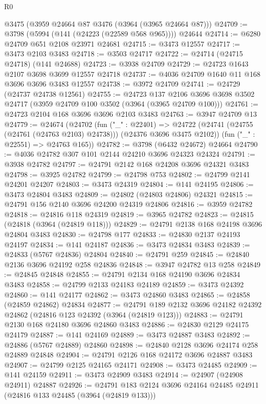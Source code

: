 \begin{lexlean}{R0}
\begin{coremodule}
    @3475
    (@3959 @24664 @87 @3476 (@3964 (@3965 @24664 @87)))
@24709 := @3798 (@5994 (@141 (@24223 (@22589 @568 @965)))) @24644
@24714 := @6280 @24709 @651 @2108 @23971 @24681
@24715 := @3473 @12557
@24717 := @3473 @2103 @3483
@24718 := @3503 @24717
@24722 := @24714 (@24715 @24718) (@141 @24688)
@24723 := @3938 @24709
@24729 := @24723 @1643 @2107 @3698 @3699 @12557 @24718
@24737 := @4036 @24709 @1640 @11 @168 @3696 @3696 @3483 @12557
@24738 := @3972 @24709
@24741 := @24729 (@24737 @24738 @12561)
@24755 := @24723
    @137
    @2106
    @3696
    @3698
    @3502
    @24717
    (@3959 @24709 @100 @3502 (@3964 (@3965 @24709 @100)))
@24761 := @24723 @2104 @168 @3696 @3696 @2103 @3483
@24763 := @3947 @24709 @13
@24779 := @24674
    (@24702
      (fun ("_" : @22401) =>
      @24722 (@24741 (@24755 (@24761 (@24763 @2103) @24738))) (@24376 @3696 @3475 @2102))
      (fun ("_" : @22551) => @24763 @165))
@24782 := @3798 (@6432 @24672) @24664
@24790 := @4036 @24782 @307 @101 @2144 @24210 @3696 @24323 @24324
@24791 := @3938 @24782
@24797 := @24791 @2142 @168 @24208 @3696 @24321 @3483
@24798 := @3925 @24782
@24799 := @24798 @753
@24802 := @24799 @2141 @24201 @24207
@24803 := @3473 @24319
@24804 := @141 @24195
@24806 := @3473 @24804 @3483
@24809 := @24802 (@24803 @24806) @24321
@24815 := @24791 @156 @2140 @3696 @24200 @24319 @24806
@24816 := @3959 @24782
@24818 := @24816 @118 @24319
@24819 := @3965 @24782
@24823 := @24815 (@24818 (@3964 (@24819 @118)))
@24829 := @24791 @2138 @168 @24198 @3696 @24804 @3483
@24830 := @24798 @177
@24833 := @24830 @2137 @24193 @24197
@24834 := @141 @24187
@24836 := @3473 @24834 @3483
@24839 := @24833 (@5767 @24836) @24804
@24840 := @24791 @259
@24845 := @24840 @2136 @3696 @24192 @258 @24836
@24848 := @3947 @24782 @13 @258
@24849 := @24845 @24848
@24855 := @24791 @2134 @168 @24190 @3696 @24834 @3483
@24858 := @24799 @2133 @24183 @24189
@24859 := @3473 @24392
@24860 := @141 @24177
@24862 := @3473 @24860 @3483
@24865 := @24858 (@24859 @24862) @24834
@24877 := @24791 @189 @2132 @3696 @24182 @24392 @24862 (@24816 @123 @24392 (@3964 (@24819 @123)))
@24883 := @24791 @2130 @168 @24180 @3696 @24860 @3483
@24886 := @24830 @2129 @24175 @24179
@24887 := @141 @24169
@24889 := @3473 @24887 @3483
@24892 := @24886 (@5767 @24889) @24860
@24898 := @24840 @2128 @3696 @24174 @258 @24889 @24848
@24904 := @24791 @2126 @168 @24172 @3696 @24887 @3483
@24907 := @24799 @2125 @24165 @24171
@24908 := @3473 @24485
@24909 := @141 @24159
@24911 := @3473 @24909 @3483
@24914 := @24907 (@24908 @24911) @24887
@24926 := @24791 @183 @2124 @3696 @24164 @24485 @24911 (@24816 @133 @24485 (@3964 (@24819 @133)))

\end{coremodule}
\end{lexlean}

